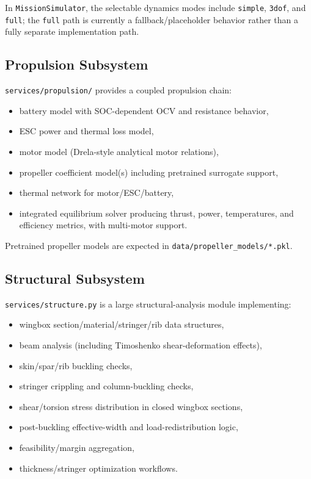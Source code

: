 ﻿\documentclass[11pt]{article}
\begin{document}
In \texttt{MissionSimulator}, the selectable dynamics modes include \texttt{simple}, \texttt{3dof}, and \texttt{full}; the \texttt{full} path is currently a fallback/placeholder behavior rather than a fully separate implementation path.

\subsection{Propulsion Subsystem}
\texttt{services/propulsion/} provides a coupled propulsion chain:
\begin{itemize}
\item battery model with SOC-dependent OCV and resistance behavior,
\item ESC power and thermal loss model,
\item motor model (Drela-style analytical motor relations),
\item propeller coefficient model(s) including pretrained surrogate support,
\item thermal network for motor/ESC/battery,
\item integrated equilibrium solver producing thrust, power, temperatures, and efficiency metrics, with multi-motor support.
\end{itemize}

Pretrained propeller models are expected in \texttt{data/propeller\_models/*.pkl}.

\subsection{Structural Subsystem}
\texttt{services/structure.py} is a large structural-analysis module implementing:
\begin{itemize}
\item wingbox section/material/stringer/rib data structures,
\item beam analysis (including Timoshenko shear-deformation effects),
\item skin/spar/rib buckling checks,
\item stringer crippling and column-buckling checks,
\item shear/torsion stress distribution in closed wingbox sections,
\item post-buckling effective-width and load-redistribution logic,
\item feasibility/margin aggregation,
\item thickness/stringer optimization workflows.
\end{itemize}
\end{document}

